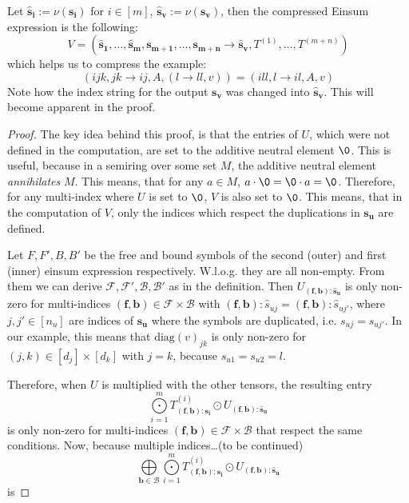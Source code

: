 \begin{theorem}
    Let $\bm{\hat{s}_i} := \nu(\bm{s_i})$ for $i \in [m]$, $\bm{\hat{s}_v} := \nu(\bm{s_v})$, then the compressed Einsum expression is the following:
    $$V = (\bm{\hat{s}_1},\dots,\bm{\hat{s}_m}, \bm{s_{m + 1}}, \dots, \bm{s_{m + n}} \rightarrow \bm{\hat{s}_v}, T^{(1)},\dots,T^{(m + n)})$$
    which helps us to compress the example:
    $$(ijk, jk \rightarrow ij, A, (l \rightarrow ll, v)) = (ill, l \rightarrow il, A, v)$$
    Note how the index string for the output $\bm{s_v}$ was changed into $\bm{\hat{s}_v}$.
    This will become apparent in the proof.
\end{theorem}

\begin{proof}
    \small
    The key idea behind this proof, is that the entries of $U$, which were not defined in the computation, are set to the additive neutral element $\0$.
    This is useful, because in a semiring over some set $M$, the additive neutral element \textit{annihilates} $M$.
    This means, that for any $a \in M$, $a \cdot \0 = \0 \cdot a = \0$.
    Therefore, for any multi-index where $U$ is set to $\0$, $V$ is also set to $\0$.
    This means, that in the computation of $V$, only the indices which respect the duplications in $\bm{s_u}$ are defined.

    Let $F, F', B, B'$ be the free and bound symbols of the second (outer) and first (inner) einsum expression respectively.
    W.l.o.g. they are all non-empty.
    From them we can derive $\mathcal{F}, \mathcal{F}', \mathcal{B}, \mathcal{B}'$ as in the definition.
    Then $U_{(\bm{f}, \bm{b}): \bm{\hat{s}_u}}$ is only non-zero for multi-indices $(\bm{f}, \bm{b}) \in \mathcal{F} \times \mathcal{B}$ with $(\bm{f}, \bm{b}):\hat{s}_{uj} = (\bm{f}, \bm{b}):\hat{s}_{uj'}$, where $j,j' \in [n_u]$ are indices of $\bm{s_u}$ where the symbols are duplicated, i.e. $s_{uj} = s_{uj'}$.
    In our example, this means that $\text{diag}(v)_{jk}$ is only non-zero for $(j,k) \in [d_j] \times [d_k]$ with $j = k$, because $s_{u1} = s_{u2} = l$.

    Therefore, when $U$ is multiplied with the other tensors, the resulting entry
    $$\bigodot\limits_{i = 1}^{m} T^{(i)}_{(\bm{f}, \bm{b}): \bm{s_i}} \odot U_{(\bm{f}, \bm{b}): \bm{\hat{s}_u}}$$
    is only non-zero for multi-indices $(\bm{f}, \bm{b}) \in \mathcal{F} \times \mathcal{B}$ that respect the same conditions.
    Now, because multiple indices\dots (to be continued)
    $$\bigoplus\limits_{\bm{b} \in \mathcal{B}} \bigodot\limits_{i = 1}^{m} T^{(i)}_{(\bm{f}, \bm{b}):\bm{s_i}} \odot U_{(\bm{f}, \bm{b}):\bm{\hat{s}_u}}$$
    is


\end{proof}

